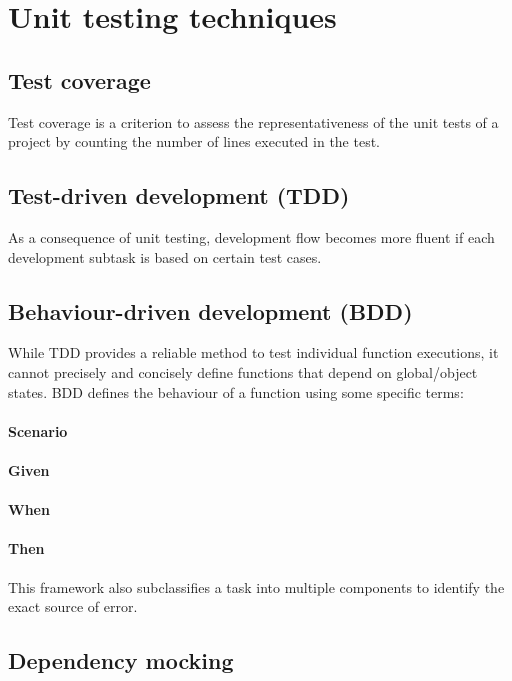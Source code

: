 \section{Unit testing techniques}
\subsection{Test coverage}
Test coverage is a criterion to assess the representativeness of the unit tests of a project by counting the number of lines executed in the test.


\subsection{Test-driven development (TDD)}
As a consequence of unit testing, development flow becomes more fluent if each development subtask is based on certain test cases.


\subsection{Behaviour-driven development (BDD)}
While TDD provides a reliable method to test individual function executions,
it cannot precisely and concisely define functions that depend on global/object states.
BDD defines the behaviour of a function using some specific terms:

\paragraph{Scenario}

\paragraph{Given}

\paragraph{When}

\paragraph{Then}

This framework also subclassifies a task into multiple components to identify the exact source of error.




\subsection{Dependency mocking}
